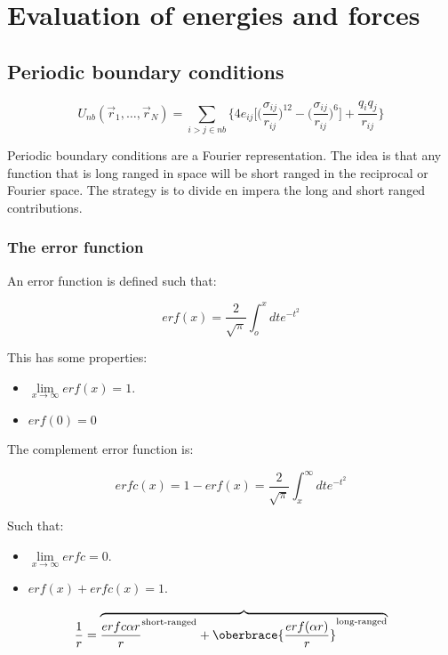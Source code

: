 \chapter{Evaluation of energies and forces}

\section{Periodic boundary conditions}

$$U_{nb}(\vec{r}_1, \dots, \vec{r}_N) = \sum\limits_{i>j\in nb}\biggl\{4e_{ij}\biggl[\biggl(\frac{\sigma_{ij}}{r_{ij}}\biggr)^{12}-\biggl(\frac{\sigma_{ij}}{r_{ij}}\biggr)^6\biggr] + \frac{q_iq_j}{r_{ij}}\biggr\}$$

Periodic boundary conditions are a Fourier representation.
The idea is that any function that is long ranged in space will be short ranged in the reciprocal or Fourier space.
The strategy is to divide en impera the long and short ranged contributions.

	\subsection{The error function}
	An error function is defined such that:

	$$erf(x) = \frac{2}{\sqrt{\pi}}\int_o^x dte^{-t^2}$$

	This has some properties:

	\begin{multicols}{2}
		\begin{itemize}
			\item $\lim\limits_{x\rightarrow \infty}erf(x) = 1$.
			\item $erf(0) = 0$
		\end{itemize}
	\end{multicols}

	The complement error function is:

	$$erfc(x) = 1- erf(x) = \frac{2}{\sqrt{\pi}}\int_x^\infty dte^{-t^2}$$

	Such that:

	\begin{multicols}{2}
		\begin{itemize}
			\item $\lim\limits_{x\rightarrow\infty} erfc = 0$.
			\item $erf(x) + erfc(x) = 1$.
		\end{itemize}
	\end{multicols}

	$$\frac{1}{r} = \overbrace{\frac{erfc{\alpha r}}{r}^{\text{short-ranged}} + \oberbrace{\frac{erf(\alpha r)}{r}}^{\text{long-ranged}}}$$

